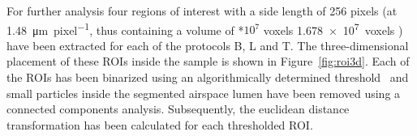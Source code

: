 \begin{figure}
%
	\else
	\fi
	\label{fig:BvsT}
\end{figure}

For further analysis four regions of interest with a side length of 256 pixels (at \SI{1.48}{\micro\meter\per pixel}, thus containing a volume of %
*$10^7$ voxels%
\else
	\SI{1.678e7}{voxels}%
\fi ) have been extracted for each of the protocols B, L and T. The three-dimensional placement of these ROIs inside the sample is shown in Figure~\ref{fig:roi3d}. Each of the ROIs has been binarized using an algorithmically determined threshold~\cite{Otsu1979} and small particles inside the segmented airspace lumen have been removed using a connected components analysis. Subsequently, the euclidean distance transformation has been calculated for each thresholded ROI.

